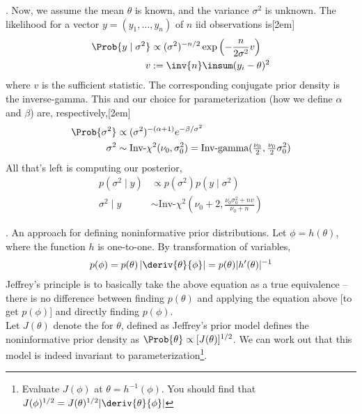\documentclass[11pt]{article}
\newcommand\myspace[1][]{\vspace{#1\bigskipamount}}
\newcommand\p{\Needspace{10\baselineskip} \noindent}
\begin{document}
\myspace
\p {}. Now, we assume the mean $\theta$ is known, and the variance $\sigma^2$ is unknown. The likelihood for a vector $y = (y_1, \ldots, y_n)$ of $n$ iid observations is[2em]
\begin{align}
	\Prob{y \mid \sigma^2} &\propto (\sigma^2)^{-n/2} \exp\left(-\frac{n}{2\sigma^2} v\right) \\
	v &:= \inv{n} \insum (y_i - \theta)^2
\end{align}
where $v$ is the sufficient statistic. The corresponding conjugate prior density is the inverse-gamma. This and our choice for parameterization (how we define $\alpha$ and $\beta$) are, respectively,[2em]
\begin{align}
	\Prob{\sigma^2} &\propto (\sigma^2)^{-(\alpha + 1)} e^{-\beta / \sigma^2} \\
	\sigma^2 &\sim \text{Inv-}\chi^2(\nu_0, \sigma_0^2) = \text{Inv-gamma}(\tfrac{\nu_0}{2}, \tfrac{\nu_0}{2}\sigma_0^2)
\end{align}
All that's left is computing our posterior,
\begin{align}
	p(\sigma^2 \mid y) &\propto p(\sigma^2) p(y \mid \sigma^2) \\
	\sigma^2 \mid y &\sim \text{Inv-}\chi^2\left(
		\nu_0 + 2,
		\frac{\nu_0 \sigma_0^2 + nv}{\nu_0 + n}
	\right)
\end{align}


\myspace
\p {}. An approach for defining noninformative prior distributions. Let $\phi = h(\theta)$, where the function $h$ is one-to-one. By transformation of variables,
\begin{align}
	p(\phi) = p(\theta) \left| \deriv{\theta}{\phi} \right|  = p(\theta) |h'(\theta)|^{-1}
\end{align}
Jeffrey's principle is to basically take the above equation as a true equivalence -- there is no difference between finding $p(\theta)$ and applying the equation above [to get $p(\phi)$] and directly finding $p(\phi)$. \\

Let $J(\theta)$ denote the  for $\theta$, defined as
Jeffrey's prior model defines the noninformative prior density as $\Prob{\theta} \propto [J(\theta)]^{1/2}$. We can work out that this model is indeed invariant to parameterization\footnote{Evaluate $J(\phi)$ at $\theta = h^{-1}(\phi)$. You should find that $J(\phi)^{1/2} = J(\theta)^{1/2}|\deriv{\theta}{\phi}|$}.
\end{document}
